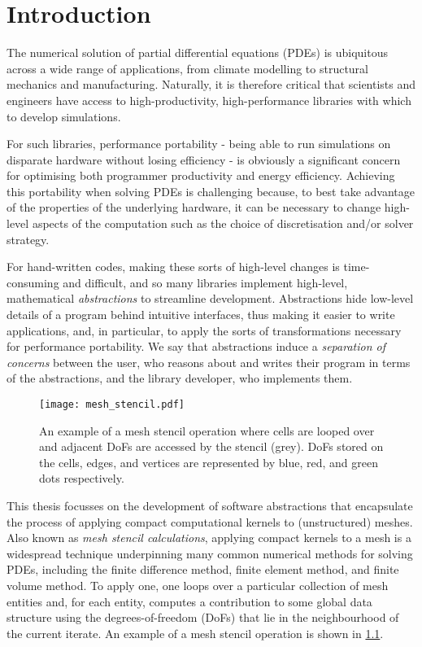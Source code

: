 \documentclass[thesis]{subfiles}
\begin{document}
\chapter{Introduction}
\label{chapter:introduction}

The numerical solution of partial differential equations (PDEs) is ubiquitous across a wide range of applications, from climate modelling to structural mechanics and manufacturing.
Naturally, it is therefore critical that scientists and engineers have access to high-productivity, high-performance libraries with which to develop simulations.

For such libraries, performance portability - being able to run simulations on disparate hardware without losing efficiency - is obviously a significant concern for optimising both programmer productivity and energy efficiency.
Achieving this portability when solving PDEs is challenging because, to best take advantage of the properties of the underlying hardware, it can be necessary to change high-level aspects of the computation such as the choice of discretisation and/or solver strategy.

For hand-written codes, making these sorts of high-level changes is time-consuming and difficult, and so many libraries implement high-level, mathematical \emph{abstractions} to streamline development.
Abstractions hide low-level details of a program behind intuitive interfaces, thus making it easier to write applications, and, in particular, to apply the sorts of transformations necessary for performance portability.
We say that abstractions induce a \emph{separation of concerns} between the user, who reasons about and writes their program in terms of the abstractions, and the library developer, who implements them.

\begin{figure}
  \centering
  \texttt{[image: mesh\_stencil.pdf]}
  \caption{
    An example of a mesh stencil operation where cells are looped over and adjacent DoFs are accessed by the stencil (grey).
    DoFs stored on the cells, edges, and vertices are represented by blue, red, and green dots respectively.
  }
  \label{fig:mesh_stencil}
\end{figure}

This thesis focusses on the development of software abstractions that encapsulate the process of applying compact computational kernels to (unstructured) meshes.
Also known as \emph{mesh stencil calculations}, applying compact kernels to a mesh is a widespread technique underpinning many common numerical methods for solving PDEs, including the finite difference method, finite element method, and finite volume method.
To apply one, one loops over a particular collection of mesh entities and, for each entity, computes a contribution to some global data structure using the degrees-of-freedom (DoFs) that lie in the neighbourhood of the current iterate.
An example of a mesh stencil operation is shown in \cref{fig:mesh_stencil}.
\end{document}
